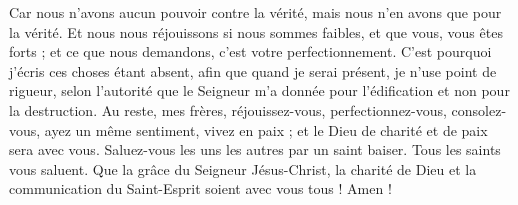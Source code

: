 \begin{multicols}{2}
Car nous n'avons aucun pouvoir contre la vérité, mais nous n'en avons que pour la vérité.
Et nous nous réjouissons si nous sommes faibles, et que vous, vous êtes forts ; et ce que nous demandons, c'est votre perfectionnement.
C'est pourquoi j'écris ces choses étant absent, afin que quand je serai présent, je n'use point de rigueur, selon l'autorité que le Seigneur m'a donnée pour l'édification et non pour la destruction.
Au reste, mes frères, réjouissez-vous, perfectionnez-vous, consolez-vous, ayez un même sentiment, vivez en paix ; et le Dieu de charité et de paix sera avec vous.
Saluez-vous les uns les autres par un saint baiser. Tous les saints vous saluent.
Que la grâce du Seigneur Jésus-Christ, la charité de Dieu et la communication du Saint-Esprit soient avec vous tous ! Amen !
\PPE{}
\end{multicols}
